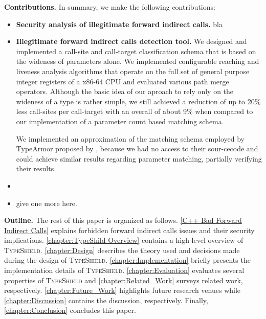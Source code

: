 \textbf{Contributions.} In summary, we make the following contributions:
\label{Contribution}
\begin{itemize}
 \item \textbf{Security analysis of illegitimate forward indirect calls.} bla

 \item \textbf{Illegitimate forward indirect calls detection tool.}
 We designed and implemented a call-site and call-target classification schema
 that is based on the wideness of parameters alone. We implemented configurable reaching and liveness analysis algorithms
 that operate on the full set of general purpose integer registers of a x86-64 CPU and evaluated various path merge operators.
 Although the basic idea of our aproach to rely only on the wideness of a type is rather simple, we still achieved a reduction
 of up to 20\% less call-sites per call-target with an overall of about 9\% when compared to our implementation of a parameter
 count based matching schema.
 
 We implemented an approximation of the matching schema employed by TypeArmor proposed by \cite{veen:typearmor}, 
 because we had no access to their sour-cecode and could achieve similar results regarding parameter matching, partially verifying
 their results.

 \item 
 
 \item give one more here.
  
\end{itemize}

\label{Outline}
\textbf{Outline.} The rest of this paper is organized as follows.
\cref{C++ Bad Forward Indirect Calls} explains forbidden forward indirect calls issues and their security implications.
\cref{chapter:TypeShild Overview} contains a high level overview of \textsc{TypeShield}.
\cref{chapter:Design} describes the theory used and decisions made during the design of \textsc{TypeShield}.
\cref{chapter:Implementation} briefly presents the implementation details of \textsc{TypeShield}.
\cref{chapter:Evaluation} evaluates several properties of \textsc{TypeShield} and
\cref{chapter:Related_Work} surveys related work, respectively.
\cref{chapter:Future_Work} highlights future research venues while 
\cref{chapter:Discussion} contains the discussion, respectively.
Finally, \cref{chapter:Conclusion} concludes this paper.



